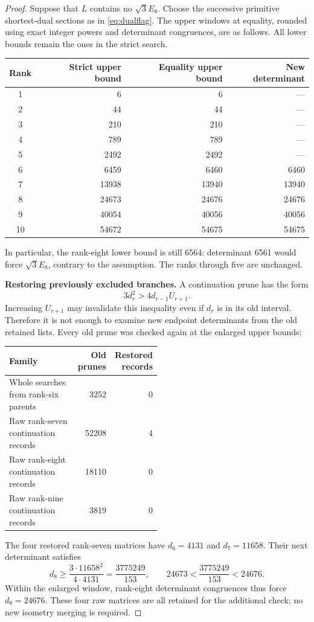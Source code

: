 \begin{proof}
Suppose that $L$ contains no $\sqrt3E_8$. Choose the successive primitive shortest-dual sections as in \eqref{eq:dualflag}. The upper windows at equality, rounded using exact integer powers and determinant congruences, are as follows. All lower bounds remain the ones in the strict search.
\begin{center}
\begin{tabular}{crrr}
\toprule
Rank & Strict upper bound & Equality upper bound & New determinant\\\midrule
1&6&6&---\\
2&44&44&---\\
3&210&210&---\\
4&789&789&---\\
5&2492&2492&---\\
6&6459&6460&6460\\
7&13938&13940&13940\\
8&24673&24676&24676\\
9&40054&40056&40056\\
10&54672&54675&54675\\
\bottomrule
\end{tabular}
\end{center}
In particular, the rank-eight lower bound is still 6564: determinant 6561 would force $\sqrt3E_8$, contrary to the assumption. The ranks through five are unchanged.

\textbf{Restoring previously excluded branches.}
A continuation prune has the form
\[
3d_r^2>4d_{r-1}U_{r+1}.
\]
Increasing $U_{r+1}$ may invalidate this inequality even if $d_r$ is in its old interval. Therefore it is not enough to examine new endpoint determinants from the old retained lists. Every old prune was checked again at the enlarged upper bounds:
\begin{center}
\begin{tabular}{P{0.50\linewidth}rr}
\toprule
Family & Old prunes & Restored records\\\midrule
Whole searches from rank-six parents &3252&0\\
Raw rank-seven continuation records &52208&4\\
Raw rank-eight continuation records &18110&0\\
Raw rank-nine continuation records &3819&0\\
\bottomrule
\end{tabular}
\end{center}
The four restored rank-seven matrices have $d_6=4131$ and $d_7=11658$. Their next determinant satisfies
\begin{equation}\label{eq:restored7floor}
d_8\ge\frac{3\cdot11658^2}{4\cdot4131}
=\frac{3775249}{153},\qquad
24673<\frac{3775249}{153}<24676.
\end{equation}
Within the enlarged window, rank-eight determinant congruences thus force $d_8=24676$. These four raw matrices are all retained for the additional check; no new isometry merging is required.


\end{proof}
